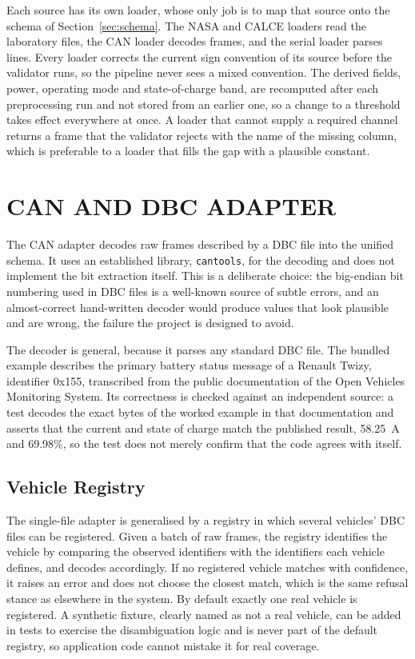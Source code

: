 Each source has its own loader, whose only job is to map that source onto the schema of Section~\ref{sec:schema}. The NASA and CALCE loaders read the laboratory files, the CAN loader decodes frames, and the serial loader parses lines. Every loader corrects the current sign convention of its source before the validator runs, so the pipeline never sees a mixed convention. The derived fields, power, operating mode and state-of-charge band, are recomputed after each preprocessing run and not stored from an earlier one, so a change to a threshold takes effect everywhere at once. A loader that cannot supply a required channel returns a frame that the validator rejects with the name of the missing column, which is preferable to a loader that fills the gap with a plausible constant.

\section{CAN AND DBC ADAPTER}

The CAN adapter decodes raw frames described by a DBC file into the unified schema. It uses an established library, \texttt{cantools}, for the decoding and does not implement the bit extraction itself. This is a deliberate choice: the big-endian bit numbering used in DBC files is a well-known source of subtle errors, and an almost-correct hand-written decoder would produce values that look plausible and are wrong, the failure the project is designed to avoid.

The decoder is general, because it parses any standard DBC file. The bundled example describes the primary battery status message of a Renault Twizy, identifier 0x155, transcribed from the public documentation of the Open Vehicles Monitoring System. Its correctness is checked against an independent source: a test decodes the exact bytes of the worked example in that documentation and asserts that the current and state of charge match the published result, 58.25~A and 69.98\%, so the test does not merely confirm that the code agrees with itself.

\subsection{Vehicle Registry}

The single-file adapter is generalised by a registry in which several vehicles' DBC files can be registered. Given a batch of raw frames, the registry identifies the vehicle by comparing the observed identifiers with the identifiers each vehicle defines, and decodes accordingly. If no registered vehicle matches with confidence, it raises an error and does not choose the closest match, which is the same refusal stance as elsewhere in the system. By default exactly one real vehicle is registered. A synthetic fixture, clearly named as not a real vehicle, can be added in tests to exercise the disambiguation logic and is never part of the default registry, so application code cannot mistake it for real coverage.

